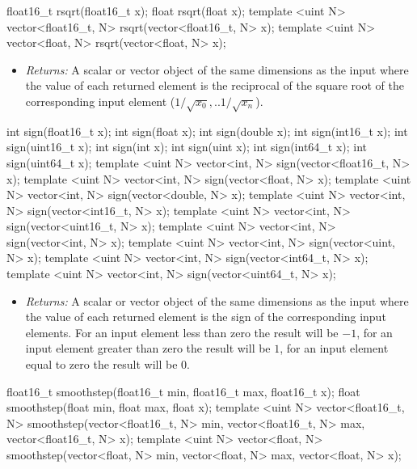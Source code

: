 \begin{HLSL}
float16_t rsqrt(float16_t x);
float rsqrt(float x);
template <uint N> vector<float16_t, N> rsqrt(vector<float16_t, N> x);
template <uint N> vector<float, N> rsqrt(vector<float, N> x);
\end{HLSL}

\begin{itemize}
  \item \textit{Returns:} A scalar or vector object of the same dimensions as
  the input where the value of each returned element is the reciprocal of the
  square root of the corresponding input element (\(1/\sqrt{x_0}, .. 1/\sqrt{x_n}\)).
\end{itemize}

\begin{HLSL}
int sign(float16_t x);
int sign(float x);
int sign(double x);
int sign(int16_t x);
int sign(uint16_t x);
int sign(int x);
int sign(uint x);
int sign(int64_t x);
int sign(uint64_t x);
template <uint N> vector<int, N> sign(vector<float16_t, N> x);
template <uint N> vector<int, N> sign(vector<float, N> x);
template <uint N> vector<int, N> sign(vector<double, N> x);
template <uint N> vector<int, N> sign(vector<int16_t, N> x);
template <uint N> vector<int, N> sign(vector<uint16_t, N> x);
template <uint N> vector<int, N> sign(vector<int, N> x);
template <uint N> vector<int, N> sign(vector<uint, N> x);
template <uint N> vector<int, N> sign(vector<int64_t, N> x);
template <uint N> vector<int, N> sign(vector<uint64_t, N> x);
\end{HLSL}

\begin{itemize}
  \item \textit{Returns:} A scalar or vector object of the same dimensions as
  the input where the value of each returned element is the sign of the
  corresponding input elements. For an input element less than zero the result
  will be $-1$, for an input element greater than zero the result will be $1$,
  for an input element equal to zero the result will be $0$.
\end{itemize}

\begin{HLSL}
float16_t smoothstep(float16_t min, float16_t max, float16_t x);
float smoothstep(float min, float max, float x);
template <uint N>
vector<float16_t, N> smoothstep(vector<float16_t, N> min,
                                vector<float16_t, N> max,
                                vector<float16_t, N> x);
template <uint N>
vector<float, N> smoothstep(vector<float, N> min, vector<float, N> max,
                            vector<float, N> x);
\end{HLSL}

